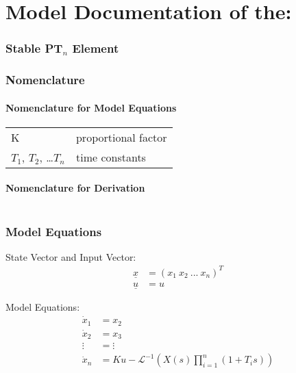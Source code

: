 \documentclass[10pt,a4paper]{article}
\begin{document}
	\part*{Model Documentation of the:}
	\section*{Stable PT$_n$ Element} %
	
	
	\section{Nomenclature} %
	\subsection{Nomenclature for Model Equations} %
	
	\begin{tabular}{ll}
		K & proportional factor \\
		$T_1$, $T_2$, \dots $T_n$ & time constants
	\end{tabular}
	
	\subsection{Nomenclature for Derivation} %
	
	\begin{tabular}{ll}
	\end{tabular}
	
	
	\section{Model Equations} %
	
	State Vector and Input Vector:
	\begin{align*}
		\underline{x} &= (x_1 \ x_2 \ ... \ x_n)^T \\
		\underline{u} &= u
	\end{align*}

	\noindent Model Equations:		
	\begin{subequations}
	\begin{align}
		\dot{x}_1 &= x_2 \\    
		\dot{x}_2 &= x_3 \\
		\vdots &= \vdots \\
		\dot{x}_n &= Ku - \mathscr{L}^{-1}(X(s) \prod_{i = 1}^{n}(1 + T_i s))
	\end{align}
	\end{subequations}
\end{document}
